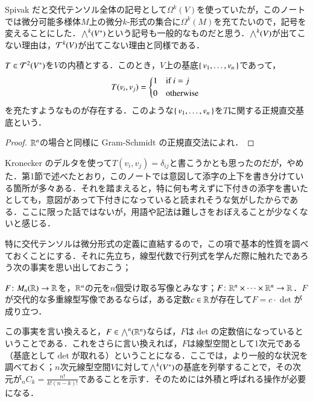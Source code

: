 \begin{dig}
Spivak だと交代テンソル全体の記号として$\Omega^k(V)$を使っていたが，このノートでは微分可能多様体$M$上の微分$k$-形式の集合に$\Omega^k(M)$を充てたいので，記号を変えることにした．$\bigwedge^k(V^*)$という記号も一般的なものだと思う．$\bigwedge^k(V)$が出てこない理由は，$\mathcal{T}^k(V)$が出てこない理由と同様である．
\end{dig}

\begin{lem}
$T \in \mathcal{T}^2(V^*)$を$V$の内積とする．このとき，$V$上の基底$\set{v_1, \dots, v_n}$であって，
\begin{equation}
T(v_i, v_j) = \begin{dcases*}
    1 & if $i=j$ \\
    0 & otherwise
  \end{dcases*}
\end{equation}
を充たすようなものが存在する．このような$\set{v_1, \dots, v_n}$を$T$に関する正規直交基底という．
\end{lem}

\begin{proof}
$\mathbb{R}^n$の場合と同様に Gram-Schmidt の正規直交法によれ．
\end{proof}

\begin{dig}
Kronecker のデルタを使って$T(v_i, v_j) = \delta_{ij}$と書こうかとも思ったのだが，やめた．第1節で述べたとおり，このノートでは意図して添字の上下を書き分けている箇所が多々ある．それを踏まえると，特に何も考えずに下付きの添字を書いたとしても，意図があって下付きになっていると読まれそうな気がしたからである．ここに限った話ではないが，用語や記法は難しさをおぼえることが少なくないと感じる．
\end{dig}

特に交代テンソルは微分形式の定義に直結するので，この項で基本的性質を調べておくことにする．それに先立ち，線型代数で行列式を学んだ際に触れたであろう次の事実を思い出しておこう；

\begin{prop}\label{行列式の特徴づけ}
$F \colon M_n(\mathbb{R}) \to \mathbb{R}$を，$\mathbb{R}^n$の元を$n$個受け取る写像とみなす；$F \colon \mathbb{R}^n \times \dots \times \mathbb{R}^n \to \mathbb{R}$．$F$が交代的な多重線型写像であるならば，ある定数$c  \in \mathbb{R}$が存在して$F = c \cdot \det$が成り立つ．
\end{prop}

この事実を言い換えると，$F \in \bigwedge^n(\mathbb{R}^n)$ならば，$F$は$\det$の定数倍になっているということである．これをさらに言い換えれば，$F$は線型空間として1次元である（基底として$\det$が取れる）ということになる．ここでは，より一般的な状況を調べておく；$n$次元線型空間$V$に対して$\bigwedge^k(V^*)$の基底を列挙することで，その次元が$_nC_k = \frac{n!}{k!(n-k)!}$であることを示す．そのためには外積と呼ばれる操作が必要になる．

